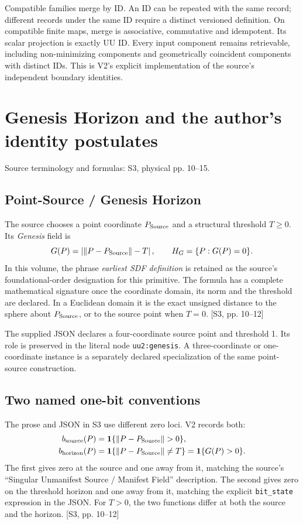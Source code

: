 \documentclass[11pt,a4paper]{article}
\numberwithin{equation}{section}
\newcommand{\newsec}[1]{\clearpage\section{#1}}
\newcommand{\src}[2]{{\sffamily\small\color{slate}[#1, #2]}}
\newcommand{\origin}[1]{{\sffamily\small\color{slate}#1}\par\vspace{3pt}}
\newcommand{\ind}{\mathbf 1}
\begin{document}
Compatible families merge by ID. An ID can be repeated with the same record; different records under the same ID require a distinct versioned definition. On compatible finite maps, merge is associative, commutative and idempotent. Its scalar projection is exactly UU ID. Every input component remains retrievable, including non-minimizing components and geometrically coincident components with distinct IDs. This is V2's explicit implementation of the source's independent boundary identities.

\newsec{Genesis Horizon and the author's identity postulates}
\label{sec:genesis}
\origin{Source terminology and formulas: S3, physical pp. 10--15.}

\subsection{Point-Source / Genesis Horizon}
The source chooses a point coordinate $P_{\rm Source}$ and a structural threshold $T\ge0$. Its \emph{Genesis} field is
\begin{equation}
G(P)=\left|\|P-P_{\rm Source}\|-T\right|,
\qquad H_G=\{P:G(P)=0\}.
\label{eq:genesis}
\end{equation}
In this volume, the phrase \emph{earliest SDF definition} is retained as the source's foundational-order designation for this primitive. The formula has a complete mathematical signature once the coordinate domain, its norm and the threshold are declared. In a Euclidean domain it is the exact unsigned distance to the sphere about $P_{\rm Source}$, or to the source point when $T=0$. \src{S3}{pp. 10--12}

The supplied JSON declares a four-coordinate source point and threshold 1. Its role is preserved in the literal node \texttt{uu2:genesis}. A three-coordinate or one-coordinate instance is a separately declared specialization of the same point-source construction.

\subsection{Two named one-bit conventions}
The prose and JSON in S3 use different zero loci. V2 records both:
\begin{align}
b_{\rm source}(P)&=\ind\{\|P-P_{\rm Source}\|>0\},\\
b_{\rm horizon}(P)&=\ind\{\|P-P_{\rm Source}\|\ne T\}
                 =\ind\{G(P)>0\}.
\end{align}
The first gives zero at the source and one away from it, matching the source's ``Singular Unmanifest Source / Manifest Field'' description. The second gives zero on the threshold horizon and one away from it, matching the explicit \texttt{bit\_state} expression in the JSON. For $T>0$, the two functions differ at both the source and the horizon. \src{S3}{pp. 10--12}
\end{document}
